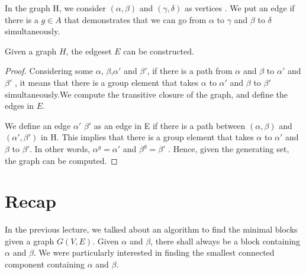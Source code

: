 In the graph H, we consider $(\alpha , \beta)$ and $(\gamma , \delta)$ as vertices . We put an edge if there is a $g \in A$ that demonstrates that we can go from $\alpha$ to $\gamma$ and $\beta$ to $\delta$ simultaneously.

\begin{claim} Given a graph $H$, the edgeset $E$ can be constructed.
\begin{proof} Considering some $\alpha$, $\beta$,$\alpha'$ and $\beta'$, if there is a path from $\alpha$ and $\beta$ to $\alpha'$ and $\beta'$ , it means that there is a group element that takes $\alpha$ to $\alpha'$ and $\beta$ to $\beta'$ simultaneously.We compute the transitive closure of the graph, and define the edges in $E$.


We define an edge $\alpha'$ $\beta'$ as an edge in E if there is a path between $(\alpha,\beta)$ and $(\alpha',\beta')$ in H. This implies that there is a group element that takes $\alpha$ to $\alpha'$ and $\beta$ to $\beta'$. 
In other words, $\alpha^g = \alpha'$ and $\beta^g = \beta'$ .
Hence, given the generating set, the graph can be computed.
\end{proof}
\end{claim}



\section{Recap}
In the previous lecture, we talked about an algorithm to find the minimal blocks given a graph $G(V,E)$. Given $\alpha$ and $\beta$, there shall always be a block containing $\alpha$ and $\beta$. We were particularly interested in finding the smallest connected component containing $\alpha$ and $\beta$.

